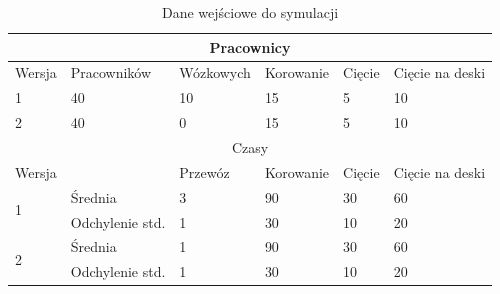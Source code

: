 \documentclass[a4paper]{article}
\begin{document}
\begin{table}[H]
\centering
\begin{tabular}{|l|l|l|l|l|l|}
\hline
\multicolumn{6}{|c|}{Pracownicy}                                                        \\ \hline
Wersja             & Pracowników     & Wózkowych & Korowanie & Cięcie & Cięcie na deski \\ \hline
1                  & 40              & 10        & 15        & 5      & 10              \\ \hline
2                  & 40              & 0         & 15        & 5      & 10              \\ \hline
\multicolumn{6}{|c|}{Czasy}                                                             \\ \hline
Wersja             &                 & Przewóz   & Korowanie & Cięcie & Cięcie na deski \\ \hline
\multirow{2}{*}{1} & Średnia         & 3         & 90        & 30     & 60              \\ \cline{2-6} 
                   & Odchylenie std. & 1         & 30        & 10     & 20              \\ \hline
\multirow{2}{*}{2} & Średnia         & 1         & 90        & 30     & 60              \\ \cline{2-6} 
                   & Odchylenie std. & 1         & 30        & 10     & 20              \\ \hline
\end{tabular}
\caption{Dane wejściowe do symulacji}
\label{tab:2}
\end{table}
\end{document}
